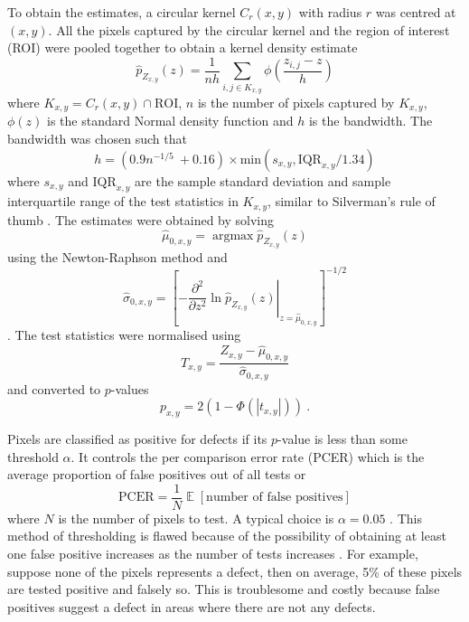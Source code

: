 \documentclass{article}
\DeclareMathOperator*{\argmax}{argmax}
\DeclareMathOperator{\expectation}{\mathbb{E}}
\begin{document}
To obtain the estimates, a circular kernel $C_r(x,y)$ with radius $r$ was centred at $(x,y)$. All the pixels captured by the circular kernel and the region of interest (ROI) were pooled together to obtain a kernel density estimate \citep{friedman2001elements, parzen1962on}
\begin{equation}
\widehat{p}_{Z_{x,y}}(z) = 
\frac{1}{nh}
  \sum_{i,j\in K_{x,y}}\phi\left(
    \dfrac{z_{i,j}-z}{h}
  \right)
\end{equation}
where $K_{x,y} = C_r(x,y) \cap \text{ROI}$, $n$ is the number of pixels captured by $K_{x,y}$, $\phi(z)$ is the standard Normal density function and $h$ is the bandwidth. The bandwidth was chosen such that
\begin{equation}
  h = (0.9n^{-1/5}\ + 0.16) \times \text{min}\left(s_{x,y},\text{IQR}_{x,y}/1.34\right)
  \label{eq:inference_ourruleofthumb}
\end{equation}
where $s_{x,y}$ and $\text{IQR}_{x,y}$ are the sample standard deviation and sample interquartile range of the test statistics in $K_{x,y}$, similar to Silverman's rule of thumb \citep{sheather2004density, silverman1986density}. The estimates were obtained by solving
\begin{equation}
\widehat\mu_{0,x,y} = \argmax\widehat{p}_{Z_{x,y}}(z)
\end{equation}
using the Newton-Raphson method and
\begin{equation}
  \widehat{\sigma}_{0,x,y} = \left[
    \left.
      -\dfrac{\partial^2}{\partial z^2}\ln\widehat{p}_{Z_{x,y}}(z)
    \right|_{z=\widehat{\mu}_{0,x,y}}
  \right]^{-1/2}
\end{equation}
\citep{efron2004large}. The test statistics were normalised using
\begin{equation}
  T_{x,y} = 
  \dfrac{
    Z_{x,y}-\widehat{\mu}_{0,x,y}
  }
  {
    \widehat{\sigma}_{0,x,y}
  }
\end{equation}
and converted to $p$-values
\begin{equation}
  p_{x,y} = 2(1-\Phi(|t_{x,y}|)) \ .
\end{equation}

Pixels are classified as positive for defects if its $p$-value is less than some threshold $\alpha$. It controls the per comparison error rate (PCER) \citep{benjamini1995controlling} which is the average proportion of false positives out of all tests or
\begin{equation}
\text{PCER}=\dfrac{1}{N}\expectation\left[\text{number of false positives}\right]
\end{equation}
where $N$ is the number of pixels to test. A typical choice is $\alpha=0.05$ \citep{wasserstein2019moving}. This method of thresholding is flawed because of the possibility of obtaining at least one false positive increases as the number of tests increases \citep{shaffer1995multiple}. For example, suppose none of the pixels represents a defect, then on average, 5\% of these pixels are tested positive and falsely so. This is troublesome and costly because false positives suggest a defect in areas where there are not any defects.
\end{document}
